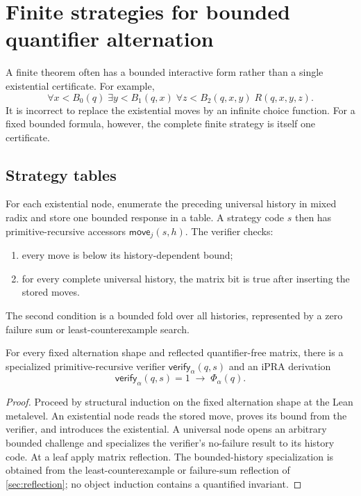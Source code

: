 \section{Finite strategies for bounded quantifier alternation}
\label{sec:strategy}

A finite theorem often has a bounded interactive form rather than a single
existential certificate.  For example,
\[
  \forall x<B_0(q)\;\exists y<B_1(q,x)\;
  \forall z<B_2(q,x,y)\;R(q,x,y,z).
\]
It is incorrect to replace the existential moves by an infinite choice
function.  For a fixed bounded formula, however, the complete finite strategy
is itself one certificate.

\subsection{Strategy tables}

For each existential node, enumerate the preceding universal history in mixed
radix and store one bounded response in a table.  A strategy code \(s\) then
has primitive-recursive accessors \(\mathsf{move}_j(s,h)\).  The verifier checks:
\begin{enumerate}[label=(\roman*)]
\item every move is below its history-dependent bound;
\item for every complete universal history, the matrix bit is true after
      inserting the stored moves.
\end{enumerate}
The second condition is a bounded fold over all histories, represented by a
zero failure sum or least-counterexample search.

\begin{theorem}
\label{thm:strategy-sound}
For every fixed alternation shape and reflected quantifier-free matrix, there
is a specialized primitive-recursive verifier
\(\mathsf{verify}_\alpha(q,s)\) and an iPRA derivation
\[
  \mathsf{verify}_\alpha(q,s)=1
   \;\longrightarrow\;
  \Phi_\alpha(q).
\]
\end{theorem}

\begin{proof}
Proceed by structural induction on the fixed alternation shape at the Lean
metalevel.  An existential node reads the stored move, proves its bound from
the verifier, and introduces the existential.  A universal node opens an
arbitrary bounded challenge and specializes the verifier's no-failure result
to its history code.  At a leaf apply matrix reflection.  The bounded-history
specialization is obtained from the least-counterexample or failure-sum
reflection of \cref{sec:reflection}; no object induction contains a quantified
invariant.
\end{proof}

